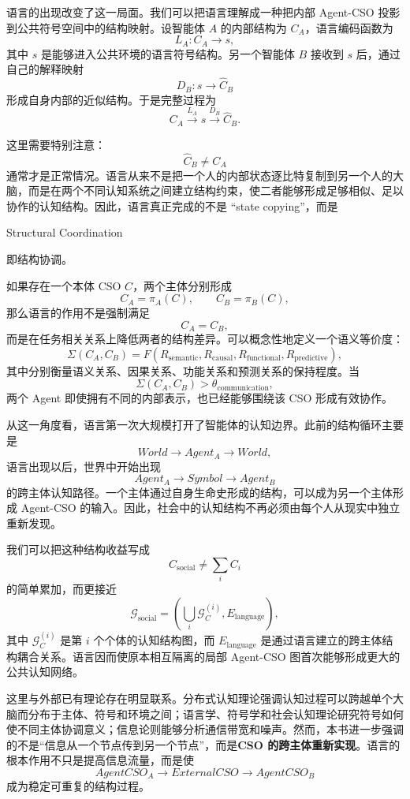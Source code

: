 语言的出现改变了这一局面。我们可以把语言理解成一种把内部 Agent-CSO 投影到公共符号空间中的结构映射。设智能体 $A$ 的内部结构为 $C_A$，语言编码函数为
\[
L_A:C_A\rightarrow s,
\]
其中 $s$ 是能够进入公共环境的语言符号结构。另一个智能体 $B$ 接收到 $s$ 后，通过自己的解释映射
\[
D_B:s\rightarrow \hat{C}_B
\]
形成自身内部的近似结构。于是完整过程为
\[
C_A
\xrightarrow{L_A}
s
\xrightarrow{D_B}
\hat{C}_B.
\]

这里需要特别注意：
\[
\hat{C}_B\neq C_A
\]
通常才是正常情况。语言从来不是把一个人的内部状态逐比特复制到另一个人的大脑，而是在两个不同认知系统之间建立结构约束，使二者能够形成足够相似、足以协作的认知结构。因此，语言真正完成的不是 ``state copying''，而是
\begin{statementbox}
Structural Coordination
\end{statementbox}
即结构协调。

如果存在一个本体 CSO $C$，两个主体分别形成
\[
C_A=\pi_A(C),\qquad
C_B=\pi_B(C),
\]
那么语言的作用不是强制满足
\[
C_A=C_B,
\]
而是在任务相关关系上降低两者的结构差异。可以概念性地定义一个语义等价度：
\[
\Sigma(C_A,C_B)
=
F(
R_{\mathrm{semantic}},
R_{\mathrm{causal}},
R_{\mathrm{functional}},
R_{\mathrm{predictive}}
),
\]
其中分别衡量语义关系、因果关系、功能关系和预测关系的保持程度。当
\[
\Sigma(C_A,C_B)>\theta_{\mathrm{communication}},
\]
两个 Agent 即使拥有不同的内部表示，也已经能够围绕该 CSO 形成有效协作。

从这一角度看，语言第一次大规模打开了智能体的认知边界。此前的结构循环主要是
\[
World
\rightarrow
Agent_A
\rightarrow
World,
\]
语言出现以后，世界中开始出现
\[
Agent_A
\rightarrow
Symbol
\rightarrow
Agent_B
\]
的跨主体认知路径。一个主体通过自身生命史形成的结构，可以成为另一个主体形成 Agent-CSO 的输入。因此，社会中的认知结构不再必须由每个人从现实中独立重新发现。

我们可以把这种结构收益写成
\[
C_{\mathrm{social}}
\neq
\sum_i C_i
\]
的简单累加，而更接近
\[
\mathcal{G}_{\mathrm{social}}
=
\left(
\bigcup_i \mathcal{G}_{C}^{(i)},
E_{\mathrm{language}}
\right),
\]
其中 $\mathcal{G}_{C}^{(i)}$ 是第 $i$ 个个体的认知结构图，而 $E_{\mathrm{language}}$ 是通过语言建立的跨主体结构耦合关系。语言因而使原本相互隔离的局部 Agent-CSO 图首次能够形成更大的公共认知网络。

这里与外部已有理论存在明显联系。分布式认知理论强调认知过程可以跨越单个大脑而分布于主体、符号和环境之间；语言学、符号学和社会认知理论研究符号如何使不同主体协调意义；信息论则能够分析通信带宽和噪声。然而，本书进一步强调的不是“信息从一个节点传到另一个节点”，而是\textbf{CSO 的跨主体重新实现}。语言的根本作用不只是提高信息流量，而是使
\[
AgentCSO_A
\rightarrow
ExternalCSO
\rightarrow
AgentCSO_B
\]
成为稳定可重复的结构过程。

